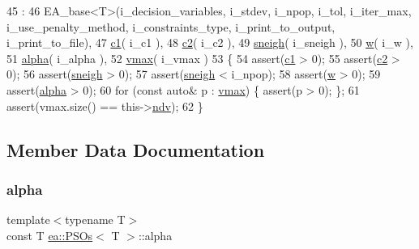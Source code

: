 \begin{DoxyCode}
45                                                                         :
46             EA\_base<T>(i\_decision\_variables, i\_stdev, i\_npop, i\_tol, i\_iter\_max, i\_use\_penalty\_method, 
      i\_constraints\_type, i\_print\_to\_output, i\_print\_to\_file),
47             \hyperlink{structea_1_1_p_s_os_ad714859d3155b4492fb01eb1664e7c65}{c1}( i\_c1 ),
48             \hyperlink{structea_1_1_p_s_os_a905b431f08e1617a0e30bdac1093927b}{c2}( i\_c2 ), 
49             \hyperlink{structea_1_1_p_s_os_a60d85bb8fdc3913239c5769906c3f917}{sneigh}( i\_sneigh ), 
50             \hyperlink{structea_1_1_p_s_os_a31794d89fb98ef9f4e887458c0982982}{w}( i\_w ), 
51             \hyperlink{structea_1_1_p_s_os_ae12721e5571bed1300a16dac83ab27cc}{alpha}( i\_alpha ), 
52             \hyperlink{structea_1_1_p_s_os_a58dfadd4951b668607176b290a18c1fa}{vmax}( i\_vmax )
53         \{
54             assert(\hyperlink{structea_1_1_p_s_os_ad714859d3155b4492fb01eb1664e7c65}{c1} > 0);
55             assert(\hyperlink{structea_1_1_p_s_os_a905b431f08e1617a0e30bdac1093927b}{c2} > 0);
56             assert(\hyperlink{structea_1_1_p_s_os_a60d85bb8fdc3913239c5769906c3f917}{sneigh} > 0);
57             assert(\hyperlink{structea_1_1_p_s_os_a60d85bb8fdc3913239c5769906c3f917}{sneigh} < i\_npop);
58             assert(\hyperlink{structea_1_1_p_s_os_a31794d89fb98ef9f4e887458c0982982}{w} > 0);
59             assert(\hyperlink{structea_1_1_p_s_os_ae12721e5571bed1300a16dac83ab27cc}{alpha} > 0);
60             \textcolor{keywordflow}{for} (\textcolor{keyword}{const} \textcolor{keyword}{auto}& p : \hyperlink{structea_1_1_p_s_os_a58dfadd4951b668607176b290a18c1fa}{vmax}) \{ assert(p > 0); \};
61             assert(vmax.size() == this->\hyperlink{structea_1_1_e_a__base_a6996abed1c0b9642bdae67547fa6474c}{ndv});
62         \}
\end{DoxyCode}


\subsection{Member Data Documentation}
\mbox{\label{structea_1_1_p_s_os_ae12721e5571bed1300a16dac83ab27cc}} 
\subsubsection{\texorpdfstring{alpha}{alpha}}
{\footnotesize\ttfamily template$<$typename T$>$ \\
const T \hyperlink{structea_1_1_p_s_os}{ea\+::\+P\+S\+Os}$<$ T $>$\+::alpha}




